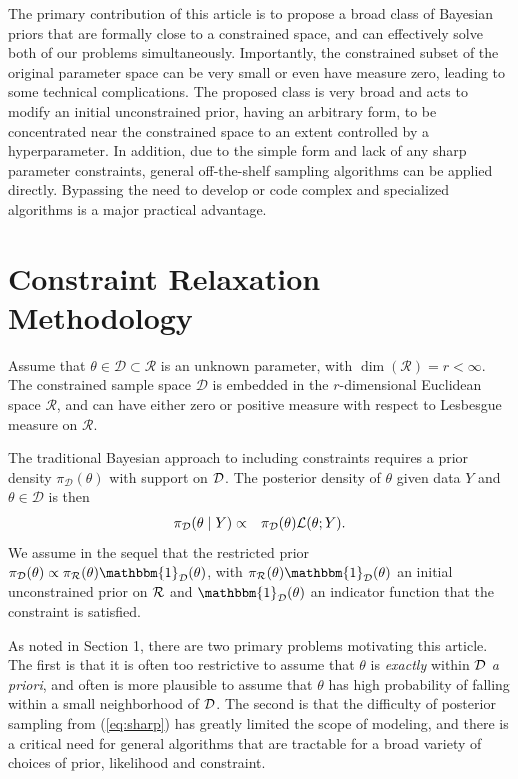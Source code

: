 \documentclass[10pt,fleqn]{article}
\DeclareMathOperator{\1}{\mathbbm{1}} \DeclareMathOperator{\bigO}{\mc O}
\begin{document}
The primary contribution of this article is to propose a broad class of Bayesian priors that are formally close to a constrained space, and can effectively solve both of our problems simultaneously.  Importantly, the constrained subset of the original parameter space can be very small or even have measure
zero, leading to some technical complications.  The proposed class is very broad and 
acts to modify an initial unconstrained prior, having an arbitrary form, to be concentrated near
the constrained space to an extent controlled by a hyperparameter.  In addition, due to the simple form and lack of any sharp parameter constraints, general off-the-shelf sampling algorithms can be applied directly.  
Bypassing the need to develop or code complex and specialized algorithms is a major practical advantage.

\section{Constraint Relaxation Methodology}

Assume that $\theta \in \mathcal{D} \subset \mathcal{R}$ is an unknown parameter, 
with $\dim(\mathcal{R})=r < \infty$.  The constrained sample space $\mathcal{D}$ is 
embedded in the $r$-dimensional Euclidean space $\mathcal{R}$, and can have 
either zero or positive measure with respect to Lesbesgue measure on $\mathcal{R}$.  

The traditional Bayesian approach to including constraints requires a
prior density $\pi_\mathcal{D}(\theta)$ with support on $\mathcal{D}$. The posterior density of $\theta$
given data $Y$ and $\theta \in \mathcal{D}$ is then
\begin{eqnarray}
\pi_{\mc D}(\theta \mid  Y) %
& \propto & \pi_\mathcal{D}(\theta)\mathcal{L}(\theta; Y). \label{eq:sharp}
\end{eqnarray}
We assume in the sequel that the restricted prior $\pi_\mathcal{D}(\theta) \propto 
\pi_{\mc R}(\theta)\mathbbm{1}_{\mc D}(\theta)$, with $\pi_{\mc R}(\theta)\mathbbm{1}_{\mc D}(\theta)$
an initial unconstrained prior on ${\mathcal{R}}$ and $\mathbbm{1}_{\mc D}(\theta)$ an indicator
function that the constraint is satisfied.

As noted in Section 1, there are two primary problems motivating this article.  The first is that it is often
too restrictive to assume that $\theta$ is {\em exactly} within ${\mathcal{D}}$ {\em a priori}, and often is more plausible to assume that $\theta$ has high probability of falling within a small neighborhood of ${\mathcal{D}}$.
The second is that the difficulty of posterior sampling from (\ref{eq:sharp}) has greatly limited the scope of modeling, and there is a critical need for general algorithms that are tractable for a broad variety of choices of prior, likelihood and constraint.
\end{document}
